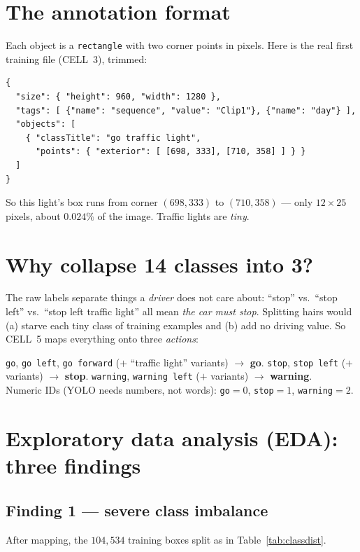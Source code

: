\section{The annotation format}
Each object is a \texttt{rectangle} with two corner points in pixels.
Here is the real first training file (CELL~3), trimmed:

\begin{verbatim}
{
  "size": { "height": 960, "width": 1280 },
  "tags": [ {"name": "sequence", "value": "Clip1"}, {"name": "day"} ],
  "objects": [
    { "classTitle": "go traffic light",
      "points": { "exterior": [ [698, 333], [710, 358] ] } }
  ]
}
\end{verbatim}

\noindent
So this light's box runs from corner $(698,333)$ to $(710,358)$ --- only
$12\times25$ pixels, about $0.024\%$ of the image. Traffic lights are
\emph{tiny}.

\section{Why collapse 14 classes into 3?}
The raw labels separate things a \emph{driver} does not care about:
``stop'' vs.\ ``stop left'' vs.\ ``stop left traffic light'' all mean
\emph{the car must stop}. Splitting hairs would (a) starve each tiny
class of training examples and (b) add no driving value. So CELL~5 maps
everything onto three \emph{actions}:

\begin{keyconcept}
\texttt{go}, \texttt{go left}, \texttt{go forward} ($+$ ``traffic light''
variants) $\rightarrow$ \textbf{go}.\quad
\texttt{stop}, \texttt{stop left} ($+$ variants) $\rightarrow$
\textbf{stop}.\quad
\texttt{warning}, \texttt{warning left} ($+$ variants) $\rightarrow$
\textbf{warning}.\\
Numeric IDs (YOLO needs numbers, not words):
\texttt{go}$=0$, \texttt{stop}$=1$, \texttt{warning}$=2$.
\end{keyconcept}

\section{Exploratory data analysis (EDA): three findings}
\subsection{Finding 1 --- severe class imbalance}
After mapping, the $104{,}534$ training boxes split as in
Table~\ref{tab:classdist}.

